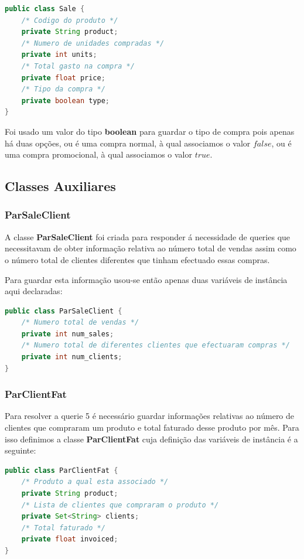 \documentclass[10pt] {article}
\begin{document}
\begin{lstlisting}[language=Java]
public class Sale {
	/* Codigo do produto */
	private String product;
	/* Numero de unidades compradas */
	private int units;
	/* Total gasto na compra */
	private float price;
	/* Tipo da compra */
	private boolean type;
}
\end{lstlisting}

\par Foi usado um valor do tipo \textbf{boolean} para guardar o tipo de compra pois apenas há duas opções, ou é uma compra 
normal, à qual associamos o valor $false$, ou é uma compra promocional, à qual associamos o valor $true$.

\subsection{Classes Auxiliares}
\subsubsection{ParSaleClient}
\par A classe \textbf{ParSaleClient} foi criada para responder á necessidade de queries que necessitavam de obter informação 
relativa ao número total de vendas assim como o número total de clientes diferentes que tinham efectuado essas compras.
\par Para guardar esta informação usou-se então apenas duas variáveis de instância aqui declaradas:

\begin{lstlisting}[language=Java]
public class ParSaleClient {
	/* Numero total de vendas */
	private int num_sales;
	/* Numero total de diferentes clientes que efectuaram compras */
	private int num_clients;
}
\end{lstlisting}

\subsubsection{ParClientFat}
\par Para resolver a querie 5 é necessário guardar informações relativas ao número de clientes que compraram um produto 
e total faturado desse produto por mês. Para isso definimos a classe \textbf{ParClientFat} cuja definição das variáveis de 
instância é a seguinte: 

\begin{lstlisting}[language=Java]
public class ParClientFat {
	/* Produto a qual esta associado */
	private String product;
	/* Lista de clientes que compraram o produto */
	private Set<String> clients;
	/* Total faturado */
	private float invoiced;
}
\end{lstlisting}
\end{document}
